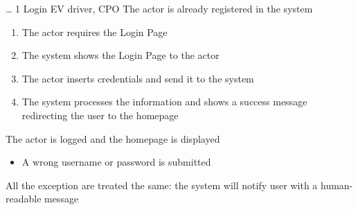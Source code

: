 \usecase
{
    \dots %
}
{1}
{Login}
{EV driver, CPO}
{The actor is already registered in the system}
{
    \begin{enumerate}
        \item The actor requires the Login Page
        \item The system shows the Login Page to the actor
        \item The actor inserts credentials and send it to the system
        \item The system processes the information and shows a success message redirecting the user to the homepage
    \end{enumerate}
}
{The actor is logged and the homepage is displayed}
{
    \begin{itemize}
        \item A wrong username or password is submitted
    \end{itemize}
}
{
    All the exception are treated the same: the system will notify user with a human-readable message
}



